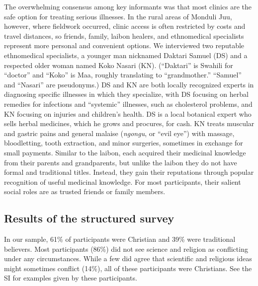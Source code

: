 \documentclass[
  11pt,
]{article}
\begin{document}
The overwhelming consensus among key informants was that most clinics are the safe option for treating serious illnesses. In the rural areas of Monduli Juu, however, where fieldwork occurred, clinic access is often restricted by costs and travel distances, so friends, family, laibon healers, and ethnomedical specialists represent more personal and convenient options. We interviewed two reputable ethnomedical specialists, a younger man nicknamed Daktari Samuel (DS) and a respected older woman named Koko Nasari (KN). (``Daktari'' is Swahili for ``doctor'' and ``Koko'' is Maa, roughly translating to ``grandmother.'' ``Samuel'' and ``Nasari'' are pseudonyms.) DS and KN are both locally recognized experts in diagnosing specific illnesses in which they specialize, with DS focusing on herbal remedies for infections and ``systemic'' illnesses, such as cholesterol problems, and KN focusing on injuries and children's health. DS is a local botanical expert who sells herbal medicines, which he grows and procures, for cash. KN treats muscular and gastric pains and general malaise (\emph{ngongu}, or ``evil eye'') with massage, bloodletting, tooth extraction, and minor surgeries, sometimes in exchange for small payments. Similar to the laibon, each acquired their medicinal knowledge from their parents and grandparents, but unlike the laibon they do not have formal and traditional titles. Instead, they gain their reputations through popular recognition of useful medicinal knowledge. For most participants, their salient social roles are as trusted friends or family members.

\hypertarget{results-of-the-structured-survey}{%
\subsection{Results of the structured survey}\label{results-of-the-structured-survey}}

In our sample, 61\% of participants were Christian and 39\% were traditional believers. Most participants (86\%) did not see science and religion as conflicting under any circumstances. While a few did agree that scientific and religious ideas might sometimes conflict (14\%), all of these participants were Christians. See the SI for examples given by these participants.
\end{document}
